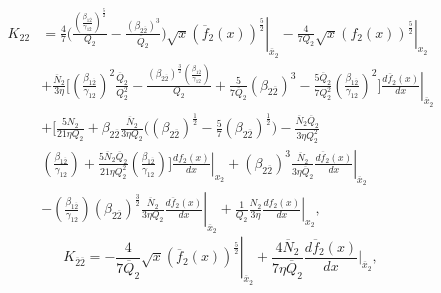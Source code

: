 \documentclass[fleqn]{article}
\begin{document}
            \begin{equation}
                \begin{split}
                          K_{22} &= \frac{4}{7} \biggl( \frac{\left(\frac{\beta_{1\overline{2}}}{\gamma_{12}}\right)^\frac{5}{2}}{Q_{2}} - \frac{\left(\beta_{2\overline{2}
                          }\right)^{3}}{\overline{Q}_{2}} \left. \biggr) \sqrt{x}  (\overline{f}_{2}(x))^\frac{5}{2} \right|_{\overline{x}_{2}} - \left. \frac{4}{7 Q_{2}} \sqrt{x} (f_{2}(x))^\frac{5}{2} \right|_{x_{2}} \\ & + \frac{\overline{N}_{2}}{3 \eta} \biggl[\left(\frac{\beta_{1\overline{2}}}{\gamma_{12}}\right)^{2} \frac{\overline{Q}_{2}}{Q_{2}^{2}} - \frac{(\beta_{2\overline{2}})^\frac{3}{2} \left(\frac{\beta_{1\overline{2}}}{\gamma_{12}}\right)}{Q_{2}}   + \frac{5}{7 \overline{Q}_{2}} (\beta_{2\overline{2}})^{3}  - \frac{5 \overline{Q}_{2}}{7 Q_{2}^{2}} \left(\frac{\beta_{1\overline{2}}}{\gamma_{12}}\right)^{2} \left. \biggr] \frac{d\overline{f}_{2}(x)}{dx} \right|_{\overline{x}_{2}} \\ & + \biggl[ \frac{5 N_{2}}{21 \eta Q_{2}} + \beta_{2\overline{2}} \frac{\overline{N}_{2}}{3 \eta Q_{2}} \biggl( (\beta_{2\overline{2}})^\frac{1}{2} - \frac{5}{7} (\beta_{2\overline{2}})^\frac{1}{2} \biggr) - \frac{\overline{N}_{2} \overline{Q}_{2}}{3 \eta Q_{2}^{2}} \\ &  \left(\frac{\beta_{1\overline{2}}}{\gamma_{12}}\right)   + \frac{5 \overline{N}_{2} \overline{Q}_{2}}{21 \eta Q_{2}^{2}} \left(\frac{\beta_{1\overline{2}}}{\gamma_{12}}\right) \left. \biggr] \frac{df_{2}(x)}{dx} \right|_{x_{2}} + (\beta_{2\overline{2}})^3\frac{\overline{N}_{2}}{3 \eta \overline{Q}_{2} } \left. \frac{d\overline{f}_{2}(x)}{dx} \right|_{\overline{x}_{2}} \\ & - \left. \left(\frac{\beta_{1\overline{2}}}{\gamma_{12}}\right) (\beta_{2\overline{2}})^\frac{3}{2}\frac{\overline{N}_{2}}{3 \eta Q_2} \frac{d \overline{f}_{2}(x)}{dx} \right|_{\overline{x}_{2}}  + \left. \frac{1}{Q_2} \frac{N_2}{3\eta} \frac{df_2(x)}{dx} \right|_{x_2},
                \end{split}
            \label{eqn:k22_caseI}
            \end{equation}
            \begin{equation}
            K_{\overline{2}\overline{2}} = - \left. \frac{4}{7\overline{Q}_{2}} \sqrt{x} (\overline{f}_{2}(x))^\frac{5}{2} \right|_{\overline{x}_{2}} + \frac{4 \overline{N}_{2}}{7 \eta \overline{Q}_{2}} \frac{d\overline{f}_{2}(x)}{dx}\biggr|_{\overline{x}_{2}},
            \label{eqn:k2bar2bar_caseI}
            \end{equation}
\end{document}
